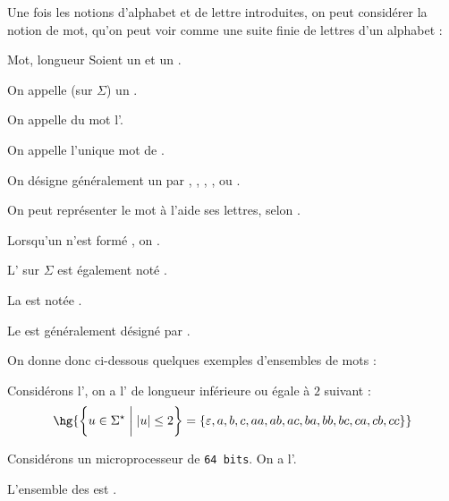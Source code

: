 \documentclass[a4paper,french,bookmarks]{book}
\begin{document}
    Une fois les notions d'alphabet et de lettre introduites, on peut considérer la notion de mot, qu'on peut voir comme une suite finie de lettres d'un alphabet :
    
    \begin{definition}{Mot, longueur}{}
        Soient \hg{$\Sigma$} un  et  un .
        \begin{enumerate}
            \itast On appelle  (sur $\Sigma$) un .
            
            \itast On appelle  du mot  l'.
            
            \itast On appelle  l'unique mot  de .
        \end{enumerate}
    \end{definition}
    
    \begin{notation}
        \begin{enumerate}
            \itt On désigne généralement un  par , , , ,  ou .
            
            \itt On peut représenter le mot  à l'aide ses lettres, selon . 
            
            \itt Lorsqu'un  n'est formé , on .
            
            \itt L' sur $\Sigma$ est également noté \hg{$\Sigma^\star$}.
            
            \itt La  est notée .
            
            \itt Le  est généralement désigné par \hg{$\epsilon$}.
        \end{enumerate}
    \end{notation}
    
    On donne donc ci-dessous quelques exemples d'ensembles de mots :
    \begin{example}{}{}
        \begin{enumerate}
            \itt Considérons l', on a l' de longueur inférieure ou égale à $2$ suivant :
            \[ \hg{\ens{u \in \Sigma^\star \vphantom{\dfrac{-}{-}}\enstq \mod{u} \leq 2} = \ens{\epsilon, a, b, c, aa, ab, ac, ba, bb, bc, ca, cb, cc}} \]
            
            \itt Considérons un microprocesseur de \texttt{64 bits}. On a l'.
            
            L'ensemble des  est . 
        \end{enumerate}
    \end{example}
    
\end{document}
